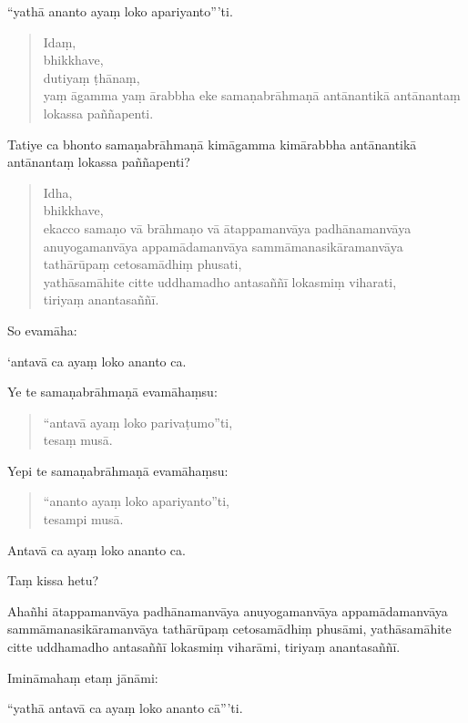 \documentclass[11pt,twoside,openright]{book}
\begin{document}
\pstart
“yathā ananto ayaṃ loko apariyanto”’ti.
\pend

\begin{verse}
Idaṃ,\\
\vin  bhikkhave,\\
\vin  dutiyaṃ ṭhānaṃ,\\
\vin  yaṃ āgamma yaṃ ārabbha eke samaṇabrāhmaṇā antānantikā antānantaṃ lokassa paññapenti.

\end{verse}
\pstart
Tatiye ca bhonto samaṇabrāhmaṇā kimāgamma kimārabbha antānantikā antānantaṃ lokassa paññapenti?
\pend

\begin{verse}
Idha,\\
\vin  bhikkhave,\\
\vin  ekacco samaṇo vā brāhmaṇo vā ātappamanvāya padhānamanvāya anuyogamanvāya appamādamanvāya sammāmanasikāramanvāya tathārūpaṃ cetosamādhiṃ phusati,\\
\vin  yathāsamāhite citte uddhamadho antasaññī lokasmiṃ viharati,\\
\vin  tiriyaṃ anantasaññī.

\end{verse}
\pstart
So evamāha:
\pend

\pstart
‘antavā ca ayaṃ loko ananto ca.
\pend

\pstart
Ye te samaṇabrāhmaṇā evamāhaṃsu:
\pend

\begin{verse}
“antavā ayaṃ loko parivaṭumo”ti,\\
\vin  tesaṃ musā.

\end{verse}
\pstart
Yepi te samaṇabrāhmaṇā evamāhaṃsu:
\pend

\begin{verse}
“ananto ayaṃ loko apariyanto”ti,\\
\vin  tesampi musā.

\end{verse}
\pstart
Antavā ca ayaṃ loko ananto ca.
\pend

\pstart
Taṃ kissa hetu?
\pend

\pstart
Ahañhi ātappamanvāya padhānamanvāya anuyogamanvāya appamādamanvāya sammāmanasikāramanvāya tathārūpaṃ cetosamādhiṃ phusāmi, yathāsamāhite citte uddhamadho antasaññī lokasmiṃ viharāmi, tiriyaṃ anantasaññī.
\pend

\pstart
Imināmahaṃ etaṃ jānāmi:
\pend

\pstart
“yathā antavā ca ayaṃ loko ananto cā”’ti.
\pend
\end{document}
